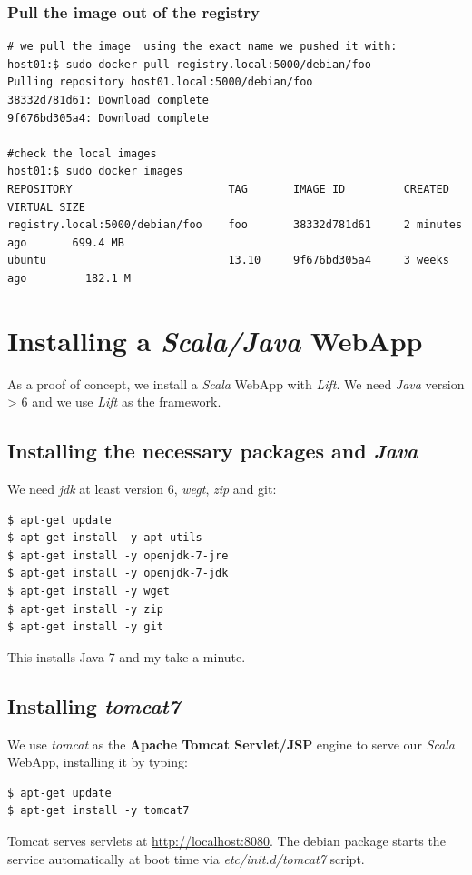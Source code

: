 \documentclass[11pt]{article}
\begin{document}
\subsubsection{Pull the image out of the registry}
\label{sec-3-7-4}


\begin{verbatim}
# we pull the image  using the exact name we pushed it with:
host01:$ sudo docker pull registry.local:5000/debian/foo
Pulling repository host01.local:5000/debian/foo
38332d781d61: Download complete 
9f676bd305a4: Download complete

#check the local images
host01:$ sudo docker images
REPOSITORY                        TAG       IMAGE ID         CREATED             VIRTUAL SIZE
registry.local:5000/debian/foo    foo       38332d781d61     2 minutes ago       699.4 MB
ubuntu                            13.10     9f676bd305a4     3 weeks ago         182.1 M
\end{verbatim}
\section{Installing a \emph{Scala/Java} WebApp}
\label{sec-4}

As a proof of concept, we install a \emph{Scala} WebApp with \emph{Lift}. We need \emph{Java} version > 6 and we use \emph{Lift} as the framework. 
\subsection{Installing the necessary packages and \emph{Java}}
\label{sec-4-1}

We need \emph{jdk} at least version 6, \emph{wegt}, \emph{zip} and git:

\begin{verbatim}
$ apt-get update
$ apt-get install -y apt-utils
$ apt-get install -y openjdk-7-jre
$ apt-get install -y openjdk-7-jdk
$ apt-get install -y wget
$ apt-get install -y zip
$ apt-get install -y git
\end{verbatim}
This installs Java 7 and my take a minute.
\subsection{Installing \emph{tomcat7}}
\label{sec-4-2}

We use \emph{tomcat} as the \textbf{Apache Tomcat Servlet/JSP} engine to serve our \emph{Scala} WebApp, installing it by typing:

\begin{verbatim}
$ apt-get update
$ apt-get install -y tomcat7
\end{verbatim}
Tomcat serves servlets  at \href{http://localhost:8080}{http://localhost:8080}. The debian package starts the service automatically at boot time via \emph{etc/init.d/tomcat7} script.
\end{document}
